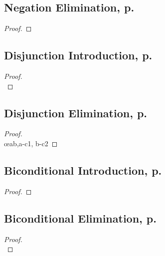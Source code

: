 \begin{multicols}{2}
\subsection{Negation Elimination, p.\ \pageref{negelim}}
\begin{proof}
\open
\close
{}
\end{proof}





\subsection{Disjunction Introduction, p.\ \pageref{disjint}}

\begin{proof}

\\	
\end{proof}

\subsection{Disjunction Elimination, p.\ \pageref{disjelim}}
\begin{proof}
\\	\open
	\close
	\open
	\close
	 \oe{ab,a-c1, b-c2}
\end{proof}



\subsection{Biconditional Introduction, p.\ \pageref{biint}}
\begin{proof}
	\open
	\close
	\open
	\close
\end{proof}

\subsection{Biconditional Elimination, p.\ \pageref{bielim}}
\begin{proof}
\\	
	 


\end{proof}
\end{multicols}
